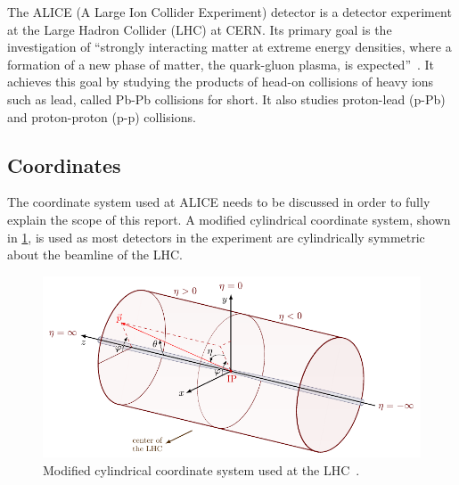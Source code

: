 The ALICE (A Large Ion Collider Experiment) detector is a detector experiment at the Large Hadron Collider (LHC) at CERN. Its primary goal is the investigation of ``strongly interacting matter at extreme energy densities, where a formation of a new phase of matter, the quark-gluon plasma, is expected''~\cite{ALICE_LOI}. It achieves this goal by studying the products of head-on collisions of heavy ions such as lead, called Pb-Pb collisions for short. It also studies proton-lead (p-Pb) and proton-proton (p-p) collisions.  

\subsection{Coordinates}
The coordinate system used at ALICE needs to be discussed in order to fully explain the scope of this report. A modified cylindrical coordinate system, shown in \cref{fig:coords}, is used as most detectors in the experiment are cylindrically symmetric about the beamline of the LHC. 

\begin{figure}[h]
    \begin{center}
        \includegraphics[width=.8\textwidth]{Figs/coords.pdf}
        \caption{Modified cylindrical coordinate system used at the LHC~\cite{coords}.}
        \label{fig:coords}
    \end{center}
\end{figure}

